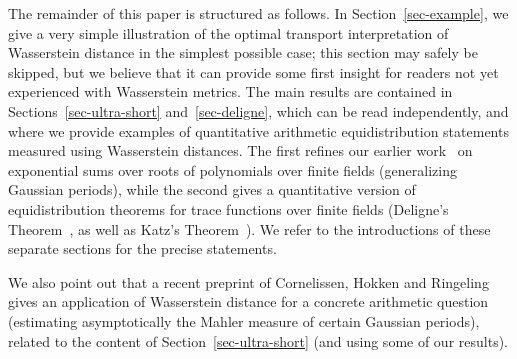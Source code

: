 \documentclass[12pt]{amsart}
\theoremstyle{plain}
\theoremstyle{remark}
\theoremstyle{definition}
\begin{document}
The remainder of this paper is structured as follows.  In
Section~\ref{sec-example}, we give a very simple illustration of the
optimal transport interpretation of Wasserstein distance in the simplest
possible case; this section may safely be skipped, but we believe that
it can provide some first insight for readers not yet experienced with
Wasserstein metrics. The main results are contained in
Sections~\ref{sec-ultra-short} and~\ref{sec-deligne}, which can be read
independently, and where we provide examples of quantitative arithmetic
equidistribution statements measured using Wasserstein distances. The
first refines our earlier work~\cite{ultrashort} on exponential sums
over roots of polynomials over finite fields (generalizing Gaussian
periods), while the second gives a quantitative version of
equidistribution theorems for trace functions over finite fields
(Deligne's Theorem~\cite{weil2}, as well as Katz's
Theorem~\cite{mellin}). We refer to the introductions of these separate
sections for the precise statements.

We also point out that a recent preprint of Cornelissen, Hokken and
Ringeling~\cite[Th.\,B]{chr} gives an application of Wasserstein
distance for a concrete arithmetic question (estimating asymptotically
the Mahler measure of certain Gaussian periods), related to the
content of Section~\ref{sec-ultra-short} (and using some of our
results).
\end{document}
